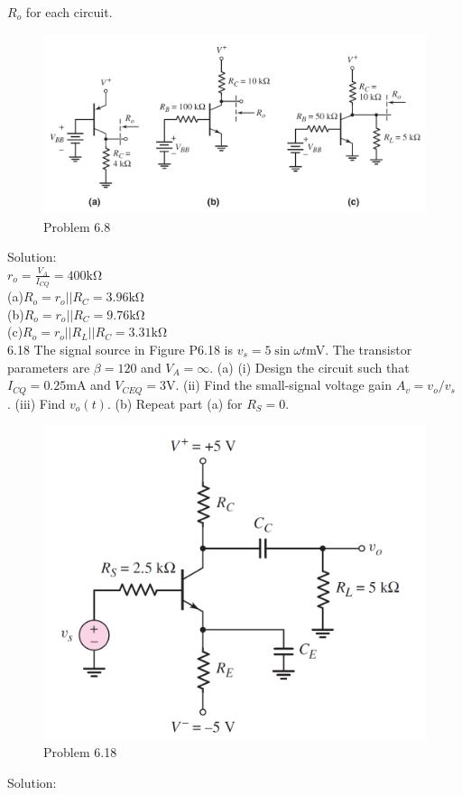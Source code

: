 \documentclass[a4paper,11pt,UTF8]{article}
\begin{document}
$R_o$ for each circuit.
\begin{figure}[H] 
	\centering 
	\includegraphics[scale=0.20]{MD6.8.png}
	\caption{Problem 6.8}
\end{figure}
\noindent Solution:\\
$r_o=\frac{V_A}{I_{CQ}}=400\mathrm{k\Omega}$\\
(a)$R_o=r_o||R_C=3.96\mathrm{k\Omega}$\\
(b)$R_o=r_o||R_C=9.76\mathrm{k\Omega}$\\
(c)$R_o=r_o||R_L||R_C=3.31\mathrm{k\Omega}$\\
6.18 The signal source in Figure P6.18 is $v_s = 5 \sin\omega t $mV. The transistor parameters
are $\beta = 120$ and $V_A =\infty$. (a) (i) Design the circuit such that
$I_{CQ} = 0.25 $mA and $V_{CEQ} = 3 $V. (ii) Find the small-signal voltage gain
$A_v = v_o/v_s$ . (iii) Find $v_o(t)$. (b) Repeat part (a) for $R_S = 0$.
\begin{figure}[H] 
	\centering 
	\includegraphics[scale=0.20]{MD6.18.png}
	\caption{Problem 6.18}
\end{figure}
\noindent Solution:\\
\end{document}
